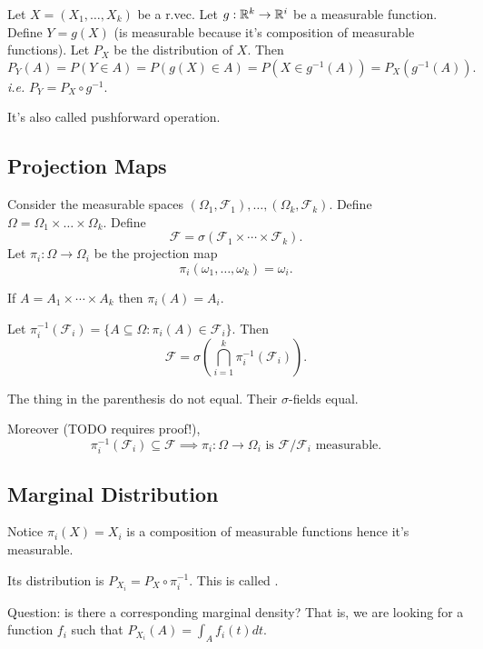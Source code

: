 \documentclass[class=article,crop=false]{standalone}
\begin{document}
\begin{thm}
	Let $ X=(X_1, \ldots, X_k)$ be a r.vec. Let $ g: \mathbb{R}^{k} \to \mathbb{R}^{i}$ be a measurable function. Define $ Y=g(X)$ (is measurable because it's composition of measurable functions). Let $ P_X$ be the distribution of  $ X$. Then
	\[
		P_Y(A) = P(Y \in A) = P(g(X) \in A) = P(X \in g^{-1}(A))= P_X(g^{-1}(A))
	.\] 
	\emph{i.e.} $ P_Y = P_X \circ g^{-1}$. 
\end{thm}

It's also called pushforward operation.


\subsection*{Projection Maps}
Consider the measurable spaces $ (\Omega_1,\mathcal{F}_1),\ldots,(\Omega_k,\mathcal{F}_k)$. Define $ \Omega= \Omega_1 \times \ldots \times \Omega_k$. Define
\[
	\mathcal{F} = \sigma(\mathcal{F}_1 \times \cdots \times \mathcal{F}_k)
.\]
Let $ \pi_i: \Omega \to \Omega_i$ be the projection map
\[
	\pi_i(\omega_1,\ldots,\omega_k) = \omega_i
.\] 
\begin{note}[]
	If $ A = A_1 \times \cdots \times A_k$ then $ \pi_i(A) = A_i$.
\end{note}

Let $ \pi_i ^{-1} (\mathcal{F}_i) = \{A \subseteq \Omega: \pi_i(A) \in \mathcal{F}_i\} $. Then
\[
	\mathcal{F}= \sigma \left( \bigcap_{ i= 1}^{k} \pi_{i}^{-1}(\mathcal{F}_i)  \right)
.\]
\begin{note}[]
The thing in the parenthesis do not equal. Their $\sigma$-fields equal.
\end{note}

Moreover (TODO requires proof!),
\[
	\pi_i ^{-1}(\mathcal{F}_i) \subseteq \mathcal{F} \implies \pi_i: \Omega \to \Omega_i \text{ is } \mathcal{F} /\mathcal{F}_i \text{ measurable} 
.\]

\subsection{Marginal Distribution}

Notice $ \pi_i(X) = X_i$ is a composition of measurable functions hence it's measurable.

Its distribution is $ P_{X_i} = P_X \circ \pi_i ^{-1}$. This is called .

Question: is there a corresponding marginal density? That is, we are looking for a function $ f_i$ such that $ P_{X_i}(A) = \int_A f_i(t) dt$. 
\end{document}
